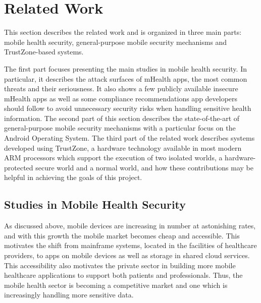 
% 
% 
\section{Related Work}
\label{sec:relatedWork}


This section describes the related work and is organized in three main parts: mobile health security, general-purpose mobile security mechanisms and TrustZone-based systems.

The first part focuses presenting the main studies in mobile health security. In particular, it describes the attack surfaces of mHealth apps, the most common threats and their seriousness. It also shows a few publicly available insecure mHealth apps as well as some compliance recommendations app developers should follow to avoid unnecessary security risks when handling sensitive health information.
The second part of this section describes the state-of-the-art of general-purpose mobile security mechanisms with a particular focus on the Android Operating System.
The third part of the related work describes systems developed using TrustZone, a hardware technology available in most modern ARM processors which support the execution of two isolated worlds, a hardware-protected secure world and a normal world, and how these contributions may be helpful in achieving the goals of this project. 

\subsection{Studies in Mobile Health Security}
\label{sec:mhealth}

As discussed above, mobile devices are increasing in number at astonishing rates, and with this growth the mobile market becomes cheap and accessible. This motivates the shift from mainframe systems, located in the facilities of healthcare providers, to apps on mobile devices as well as storage in shared cloud services. This accessibility also motivates the private sector in building more mobile healthcare applications to support both patients and professionals. Thus, the mobile health sector is becoming a competitive market and one which is increasingly handling more sensitive data.

